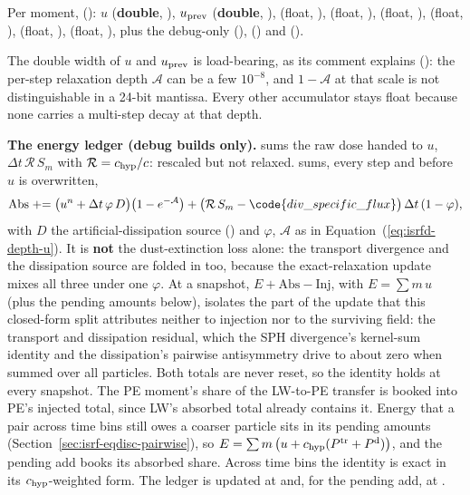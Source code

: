 Per moment, 
(): $u$ (\textbf{double},
), $u_{\rm prev}$ (\textbf{double}, ),
 (float, ),  (float,
),  (float, ), 
(float, ),  (float, ),
 (float, ), plus the debug-only
 (), 
() and  ().

The double width of $u$ and $u_{\rm prev}$ is load-bearing, as its comment explains
(): the per-step relaxation depth
$\mathcal{A}$ can be a few $10^{-8}$, and $1-\mathcal{A}$ at that scale is not
distinguishable in a 24-bit mantissa. Every other accumulator stays float because
none carries a multi-step decay at that depth.

\textbf{The energy ledger (debug builds only).} 
sums the raw dose handed to $u$, $\Delta t\,\mathcal{R}\,S_m$ with
$\mathcal{R} = c_{\rm hyp}/c$: rescaled but not relaxed.
 sums, every step and before $u$ is overwritten,
\begin{equation}
  \mathrm{Abs} \mathrel{+}=
    \big(u^{n} + \Delta t\,\varphi\,D\big)\big(1 - e^{-\mathcal{A}}\big)
    + \big(\mathcal{R}\,S_m - \code{div\_specific\_flux}\big)\,\Delta t\,(1-\varphi),
\end{equation}
with $D$ the artificial-dissipation source () and
$\varphi$, $\mathcal{A}$ as in Equation~(\ref{eq:isrfd-depth-u}). It is
\textbf{not} the dust-extinction loss alone: the transport divergence and the
dissipation source are folded in too, because the exact-relaxation update mixes
all three under one $\varphi$. At a snapshot, $E + \mathrm{Abs} - \mathrm{Inj}$,
with $E = \sum m\,u$ (plus the pending amounts below), isolates the part of the update that this closed-form split
attributes neither to injection nor to the surviving field: the transport and
dissipation residual, which the SPH divergence's kernel-sum identity and the
dissipation's pairwise antisymmetry drive to about zero when summed over all
particles. Both totals are never reset, so the identity holds at every snapshot.
The PE moment's share of the LW-to-PE transfer is booked into PE's injected total,
since LW's absorbed total already contains it. Energy that a pair across time
bins still owes a coarser particle sits in its pending amounts
(Section~\ref{sec:isrf-eqdisc-pairwise}), so
$E = \sum m\,\big(u + c_{\rm hyp}(P^{\rm tr} + P^{\rm d})\big)$, and the
pending add books its absorbed share. Across time bins the identity is exact
in its $c_{\rm hyp}$-weighted form. The ledger is updated at
 and, for the pending add, at
.

